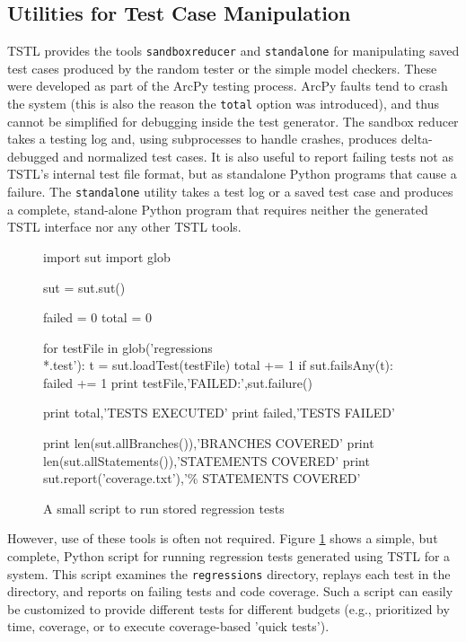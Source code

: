 \subsection{Utilities for Test Case Manipulation}

TSTL provides the tools {\tt sandboxreducer} and {\tt standalone} for manipulating saved test cases produced by the random tester or the simple model checkers.  These were developed as part of the ArcPy testing process.  ArcPy faults tend to crash the system (this is also the reason the {\tt total} option was introduced), and thus cannot be simplified for debugging inside the test generator.   The sandbox reducer takes a testing log and, using subprocesses to handle crashes, produces delta-debugged and normalized test cases. It is also useful to report failing tests not as TSTL's internal test file format, but as standalone Python programs that cause a failure.  The {\tt standalone} utility takes a test log or a saved test case and produces a complete, stand-alone Python program that requires neither the generated TSTL interface nor any other TSTL tools.

\begin{figure}
{\scriptsize
\begin{code}
import sut
import glob

sut = sut.sut()

failed = 0
total = 0

for testFile in glob('regressions\\*.test'):
   t = sut.loadTest(testFile)
   total += 1
   if sut.failsAny(t):
       failed += 1
       print testFile,'FAILED:',sut.failure()

print total,'TESTS EXECUTED'
print failed,'TESTS FAILED'

print len(sut.allBranches()),'BRANCHES COVERED'
print len(sut.allStatements()),'STATEMENTS COVERED'
print sut.report('coverage.txt'),'\% STATEMENTS COVERED'
\end{code}
}
\caption{A small script to run stored regression tests}
\label{fig:regress}
\end{figure}


However, use of these tools is often not required.  Figure \ref{fig:regress} shows a simple, but complete, Python script for running regression tests generated using TSTL for a system.  This script examines the {\tt regressions} directory, replays each test in the directory, and reports on failing tests and code coverage.  Such a script can easily be customized to provide different tests for different budgets (e.g., prioritized by time, coverage, or to execute coverage-based 'quick tests').

